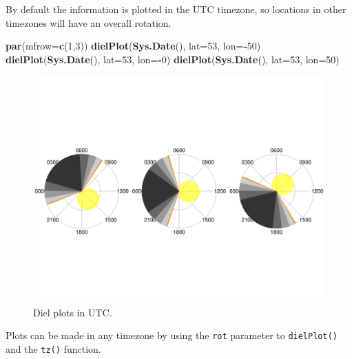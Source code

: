 \documentclass[
]{book}
\newenvironment{Shaded}{\begin{snugshade}}{\end{snugshade}}
\newcommand{\AttributeTok}[1]{\textcolor[rgb]{0.13,0.29,0.53}{#1}}
\newcommand{\DecValTok}[1]{\textcolor[rgb]{0.00,0.00,0.81}{#1}}
\newcommand{\FunctionTok}[1]{\textcolor[rgb]{0.13,0.29,0.53}{\textbf{#1}}}
\newcommand{\NormalTok}[1]{#1}
\newcommand{\SpecialCharTok}[1]{\textcolor[rgb]{0.81,0.36,0.00}{\textbf{#1}}}
\begin{document}
By default the information is plotted in the UTC timezone, so locations in other timezones will have an overall rotation.

\begin{Shaded}
\begin{Highlighting}[]
\FunctionTok{par}\NormalTok{(}\AttributeTok{mfrow=}\FunctionTok{c}\NormalTok{(}\DecValTok{1}\NormalTok{,}\DecValTok{3}\NormalTok{))}
\FunctionTok{dielPlot}\NormalTok{(}\FunctionTok{Sys.Date}\NormalTok{(), }\AttributeTok{lat=}\DecValTok{53}\NormalTok{, }\AttributeTok{lon=}\SpecialCharTok{{-}}\DecValTok{50}\NormalTok{)}
\FunctionTok{dielPlot}\NormalTok{(}\FunctionTok{Sys.Date}\NormalTok{(), }\AttributeTok{lat=}\DecValTok{53}\NormalTok{, }\AttributeTok{lon=}\SpecialCharTok{{-}}\DecValTok{0}\NormalTok{)}
\FunctionTok{dielPlot}\NormalTok{(}\FunctionTok{Sys.Date}\NormalTok{(), }\AttributeTok{lat=}\DecValTok{53}\NormalTok{, }\AttributeTok{lon=}\DecValTok{50}\NormalTok{)}
\end{Highlighting}
\end{Shaded}

\begin{figure}

{\centering \includegraphics[width=0.9\linewidth]{_main_files/figure-latex/diel-plot-no-tz-1} 

}

\caption{Diel plots in UTC.}\label{fig:diel-plot-no-tz}
\end{figure}

Plots can be made in any timezone by using the \texttt{rot} parameter to \texttt{dielPlot()} and the \texttt{tz()} function.
\end{document}
